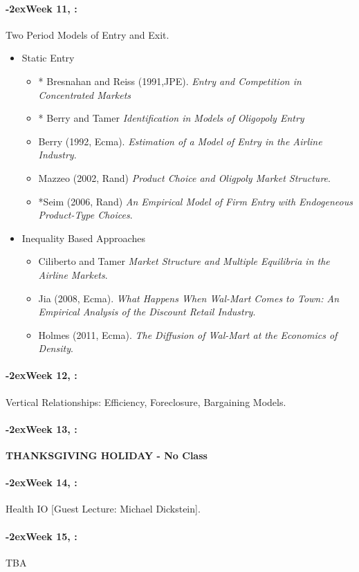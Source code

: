 \documentclass[11pt]{article}
\newcommand{\week}[1]{%
  \paragraph*{\kern-2ex\quad #1, \syldate{\today}:}%
  \ifdim\wd1=\wd\THURSDAY
    \AdvanceDate[7]
  \else
    \AdvanceDate[7]
  \fi%
}
\begin{document}
\week{Week 11} Two Period Models of Entry and Exit.
\begin{itemize}
\item Static Entry
\begin{itemize}
\item * Bresnahan and Reiss (1991,JPE). \textit{Entry and Competition in Concentrated Markets}
\item * Berry and Tamer \textit{Identification in Models of Oligopoly Entry}
\item Berry (1992, Ecma). \textit{Estimation of a Model of Entry in the Airline Industry}.
\item Mazzeo (2002, Rand) \textit{Product Choice and Oligpoly Market Structure}.
\item *Seim (2006, Rand) \textit{ An Empirical Model of Firm Entry with Endogeneous Product-Type Choices}.
\end{itemize}
\item Inequality Based Approaches
\begin{itemize}
\item Ciliberto and Tamer \textit{Market Structure and Multiple Equilibria in the Airline Markets}.
\item Jia (2008, Ecma). \textit{What Happens When Wal-Mart Comes to Town: An Empirical Analysis of the Discount Retail Industry}.
\item Holmes (2011, Ecma). \textit{The Diffusion of Wal-Mart at the Economics of Density}.
\end{itemize}
\end{itemize}

\week{Week 12} Vertical Relationships: Efficiency, Foreclosure, Bargaining Models.
\week{Week 13} \textbf{THANKSGIVING HOLIDAY - No Class}
\week{Week 14} Health IO [Guest Lecture: Michael Dickstein].
\week{Week 15} TBA
\end{document}
